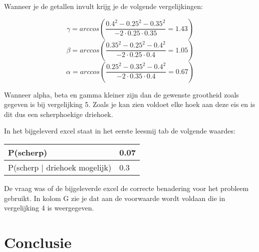\documentclass{article}
\begin{document}
\begin{enumerate}[label=(\Alph*)]
Wanneer je de getallen invult krijg je de volgende vergelijkingen:

\begin{equation} \gamma = arccos(\frac{0.4^{2} - 0.25^{2} - 0.35^{2}}{- 2 \cdot 0.25 \cdot 0.35} = 1.43) \end{equation}
\begin{equation} \beta = arccos(\frac{0.35^{2} - 0.25^{2} - 0.4^{2}}{- 2 \cdot 0.25 \cdot 0.4} = 1.05) \end{equation}
\begin{equation} \alpha = arccos(\frac{0.25^{2} - 0.35^{2} - 0.4^{2}}{- 2 \cdot 0.35 \cdot 0.4} = 0.67) \end{equation}

Wanneer alpha, beta en gamma kleiner zijn dan de gewenste grootheid zoals gegeven is bij vergelijking 5.
Zoals je kan zien voldoet elke hoek aan deze eis en is dit dus een scherphoekige driehoek.
\end{enumerate}

In het bijgeleverd excel staat in het eerste leesmij tab de volgende waardes:

\begin{table}[h]
  \begin{tabular}{|l|l|}
      \hline
      P(scherp) & 0.07 \\ \hline
      P(scherp | driehoek mogelijk)  & 0.3 \\ 
      \hline
  \end{tabular}
\end{table}

De vraag was of de bijgeleverde excel de correcte benadering voor het probleem gebruikt. In kolom G zie je dat aan de voorwaarde wordt voldaan die in vergelijking 4 is weergegeven. 
\section{Conclusie}
\label{subsec:sample_con}
\end{document}
